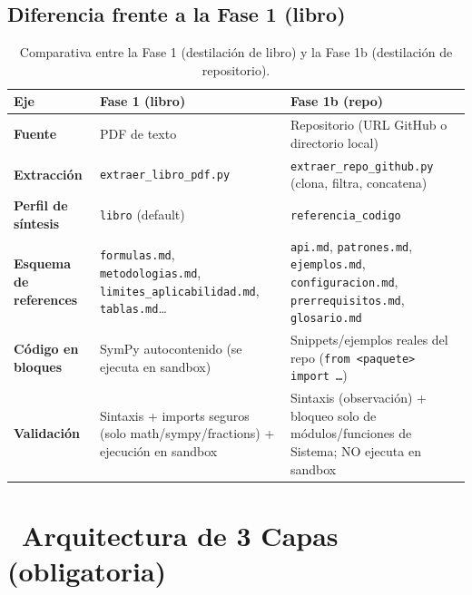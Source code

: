 \documentclass[11pt,a4paper]{article}
\newcommand{\iconotexto}[2]{\textcolor{cyanNeon}{\faIcon{#1}}~#2}
\begin{document}
\subsection{Diferencia frente a la Fase 1 (libro)}

\begin{table}[h!]
\centering
\small
\begin{tabularx}{\linewidth}{>{\bfseries\color{azulNoche}}l >{\raggedright\arraybackslash}X >{\raggedright\arraybackslash}X}
\toprule
\rowcolor{azulNoche!12}\textbf{Eje} & \textbf{Fase 1 (libro)} & \textbf{Fase 1b (repo)} \\
\midrule
Fuente & PDF de texto & Repositorio (URL GitHub o directorio local) \\
\midrule
Extracción & \texttt{extraer\_libro\_pdf.py} & \texttt{extraer\_repo\_github.py} (clona, filtra, concatena) \\
\midrule
Perfil de síntesis & \texttt{libro} (default) & \texttt{referencia\_codigo} \\
\midrule
Esquema de references & \texttt{formulas.md}, \texttt{metodologias.md}, \texttt{limites\_aplicabilidad.md}, \texttt{tablas.md}\dots & \texttt{api.md}, \texttt{patrones.md}, \texttt{ejemplos.md}, \texttt{configuracion.md}, \texttt{prerrequisitos.md}, \texttt{glosario.md} \\
\midrule
Código en bloques & SymPy autocontenido (se ejecuta en sandbox) & Snippets/ejemplos reales del repo (\texttt{from <paquete> import \dots}) \\
\midrule
Validación & Sintaxis + imports seguros (solo math/sympy/fractions) + ejecución en sandbox & Sintaxis (observación) + bloqueo solo de módulos/funciones de Sistema; NO ejecuta en sandbox \\
\bottomrule
\end{tabularx}
\caption{Comparativa entre la Fase 1 (destilación de libro) y la Fase 1b (destilación de repositorio).}
\end{table}

\section{\iconotexto{layer-group}{Arquitectura de 3 Capas (obligatoria)}}
\end{document}

